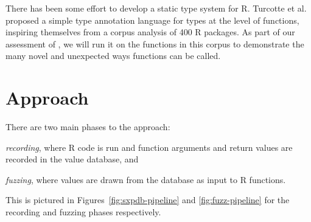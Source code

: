 \documentclass[sigplan,anonymous,review]{acmart}
\begin{document}
There has been some effort to develop a static type system for R.
Turcotte et al.~\cite{turcotte2020designing} proposed a simple type annotation language for types at the level of functions, inspiring themselves from a corpus analysis of 400 R packages.
As part of our assessment of \tool, we will run it on the functions in this corpus to demonstrate the many novel and unexpected ways functions can be called.




\section{Approach}
\label{sec:fuzzy}

There are two main phases to the approach:
%
\begin{inparaenum}[(1)]
\item \emph{recording}, where R code is run and function arguments and return values are recorded in the value database, and %
\item \emph{fuzzing}, where values are drawn from the database as input to R functions. 
\end{inparaenum}
%
This is pictured in Figures~\ref{fig:sxpdb-pipeline} and \ref{fig:fuzz-pipeline} for the recording and fuzzing phases respectively.
\end{document}
